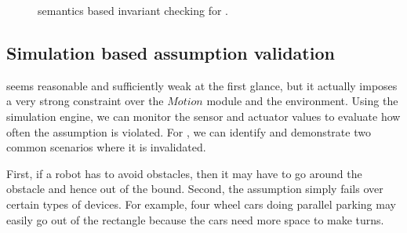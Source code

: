 
\begin{figure}
\caption{\K semantics based invariant checking for \lgname.}
\label{fig:tools}
\end{figure}

\subsection{Simulation based assumption validation}

 seems reasonable and sufficiently weak at the first glance,
but it actually imposes a very strong constraint over the $Motion$ module and the environment.
Using the simulation engine, we can monitor the sensor and actuator values to evaluate how often the assumption is violated.
For , we can identify and demonstrate two common scenarios
where it is invalidated.

First, if a robot has to avoid obstacles,
then it may have to go around the obstacle and hence out of the bound.
Second, the assumption simply fails over certain types of devices.
For example, four wheel cars doing parallel parking may easily go out of the rectangle
because the cars need more space to make turns.

